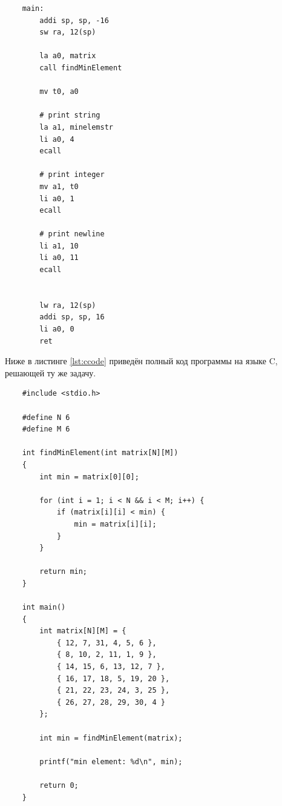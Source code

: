 \documentclass[14pt]{extarticle}
\begin{document}
\begin{listing}[H] 
    \begin{verbatim}
    main:
        addi sp, sp, -16
        sw ra, 12(sp)

        la a0, matrix
        call findMinElement

        mv t0, a0
    
        # print string
        la a1, minelemstr
        li a0, 4
        ecall

        # print integer
        mv a1, t0
        li a0, 1
        ecall

        # print newline
        li a1, 10
        li a0, 11
        ecall


        lw ra, 12(sp)
        addi sp, sp, 16
        li a0, 0
        ret

    \end{verbatim} 
\caption{Код функции \textit{main} на языке ассемблера RISC-V} 
\label{lst:asmcode_main} 
\end{listing}

Ниже в листинге \ref{lst:ccode} приведён полный код программы на языке C, решающей ту же задачу.
\begin{listing}[H]
    \begin{verbatim}
    #include <stdio.h>

    #define N 6
    #define M 6

    int findMinElement(int matrix[N][M])
    {
        int min = matrix[0][0];

        for (int i = 1; i < N && i < M; i++) {
            if (matrix[i][i] < min) {
                min = matrix[i][i];
            }
        }

        return min;
    }

    int main()
    {
        int matrix[N][M] = {
            { 12, 7, 31, 4, 5, 6 },
            { 8, 10, 2, 11, 1, 9 },
            { 14, 15, 6, 13, 12, 7 },
            { 16, 17, 18, 5, 19, 20 },
            { 21, 22, 23, 24, 3, 25 },
            { 26, 27, 28, 29, 30, 4 }
        };

        int min = findMinElement(matrix);

        printf("min element: %d\n", min);

        return 0;
    }
    \end{verbatim}
\caption{Код программы на C}
\label{lst:ccode}
\end{listing}
\end{document}
